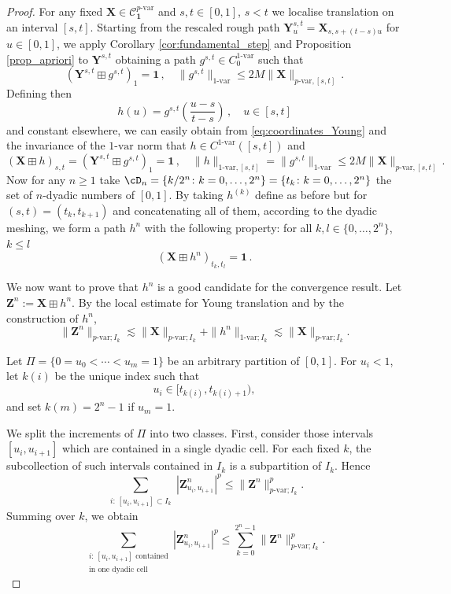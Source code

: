 \documentclass[12pt,a4paper]{article}
\numberwithin{equation}{section}
\theoremstyle{plain}
\theoremstyle{definition}
\theoremstyle{remark}
\begin{document}
\begin{proof}
 For any fixed $\mathbf X \in \mathcal{C}^{p\text{-var}}_{\mathbf{1}} $   and $s,t\in[0,1]$, $s<t$ we localise translation on an interval $[s,t]$. Starting from the rescaled rough path $\mathbf{Y}^{s,t}_u=\mathbf X_{s,s+ (t-s)u}$ for $u\in [0,1]$, we apply Corollary \ref{cor:fundamental_step} and Proposition \ref{prop_apriori} to $\mathbf{Y}^{s,t}$ obtaining a path $g^{s,t}\in C^{1\text{-var}}_0 $ such that
\[
(\mathbf{Y}^{s,t}\boxplus g^{s,t})_1= \mathbf{1}\,, \quad \| g^{s,t}\|_{1\text{-var}}\leq 2 M \|\mathbf{X}\|_{p\text{-var}, [s,t]}\,.
\]
Defining then  
\[h(u)= g^{s,t}\left(\frac{u-s}{t-s}\right)\,, \quad u\in [s,t]\]
and constant elsewhere, we can easily obtain from \eqref{eq:coordinates_Young} and the invariance of the $1\text{-var}$ norm that $ h\in C^{1\text{-var}}([s,t]) $ and
\begin{equation}\label{eq_estimates} (\mathbf{X}\boxplus h)_{s,t}= (\mathbf{Y}^{s,t}\boxplus g^{s,t})_1= \mathbf{1}\,, \quad \| h\|_{1\text{-var}, [s,t]}=\| g^{s,t}\|_{1\text{-var}}\leq 2 M \|\mathbf{X}\|_{p\text{-var}, [s,t]}\,.
\end{equation}
 Now for any $n\geq 1$ take $\cD_n=\{k/2^n\colon k=0,\ldots, 2^n\}=\{t_k\colon k=0,\ldots, 2^n\}$ the set of $n$-dyadic numbers of $[0,1]$. By taking  $h^{(k)}$ define as before but for $(s,t)=(t_k,t_{k+1})$ and concatenating all of them, according to the dyadic meshing, we form a path $h^{n}$ with the following property: for all $k,l\in \{0,\ldots, 2^n\}$, $k\leq l$
\begin{equation}\label{eq_identity}
(\mathbf X\boxplus h^n )_{t_k,t_l}=\mathbf 1\,.
\end{equation}

	We now want to prove that $h^n$ is a good candidate for the convergence result. Let \(\mathbf Z^n:=\mathbf X\boxplus h^n\). By the local estimate for Young translation and by the construction of \(h^n\),
\begin{equation} \label{eq:313}
\|\mathbf{Z}^n\|_{p\text{-var};I_k}
\lesssim
\|\mathbf X\|_{p\text{-var};I_k}
+
\|h^n\|_{1\text{-var};I_k}
\lesssim
\|\mathbf X\|_{p\text{-var};I_k}.
\end{equation}

Let \(\Pi=\{0=u_0<\cdots<u_m=1\}\) be an arbitrary partition of \([0,1]\). For
\(u_i<1\), let \(k(i)\) be the unique index such that
\[
u_i\in [t_{k(i)},t_{k(i)+1}),
\]
and set \(k(m)=2^n-1\) if \(u_m=1\).

We split the increments of \(\Pi\) into two classes. First, consider those intervals
\([u_i,u_{i+1}]\) which are contained in a single dyadic cell. For each fixed \(k\), the
subcollection of such intervals contained in \(I_k\) is a subpartition of \(I_k\). Hence
\[
\sum_{\substack{i:\,[u_i,u_{i+1}]\subset I_k}}
|\mathbf{Z}^n_{u_i,u_{i+1}}|^p
\le
\|\mathbf{Z}^n\|_{p\text{-var};I_k}^p .
\]
Summing over \(k\), we obtain
\begin{equation} \label{eq:314}
\sum_{\substack{i:\,[u_i,u_{i+1}]\text{ contained}\\ \text{in one dyadic cell}}}
|\mathbf{Z}^n_{u_i,u_{i+1}}|^p
\le
\sum_{k=0}^{2^n-1}
\|\mathbf{Z}^n\|_{p\text{-var};I_k}^p .
\end{equation}


\end{proof}
\end{document}
